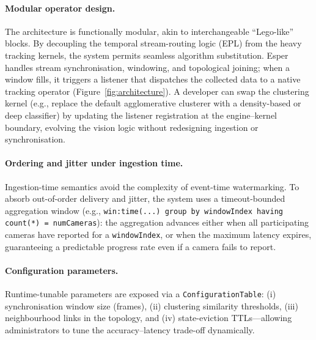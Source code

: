 \documentclass[review]{elsarticle}
\begin{document}
\paragraph{Modular operator design.}
The architecture is functionally modular, akin to interchangeable ``Lego-like'' blocks. By decoupling the temporal stream-routing logic (EPL) from the heavy tracking kernels, the system permits seamless algorithm substitution. Esper handles stream synchronisation, windowing, and topological joining; when a window fills, it triggers a listener that dispatches the collected data to a native tracking operator (Figure~\ref{fig:architecture}). A developer can swap the clustering kernel (e.g., replace the default agglomerative clusterer with a density-based or deep classifier) by updating the listener registration at the engine--kernel boundary, evolving the vision logic without redesigning ingestion or synchronisation.

\paragraph{Ordering and jitter under ingestion time.}
Ingestion-time semantics avoid the complexity of event-time watermarking. To absorb out-of-order delivery and jitter, the system uses a timeout-bounded aggregation window (e.g., \texttt{win:time(...) group by windowIndex having count(*) = numCameras}): the aggregation advances either when all participating cameras have reported for a \texttt{windowIndex}, or when the maximum latency expires, guaranteeing a predictable progress rate even if a camera fails to report.

\paragraph{Configuration parameters.}
Runtime-tunable parameters are exposed via a \texttt{ConfigurationTable}: (i) synchronisation window size (frames), (ii) clustering similarity thresholds, (iii) neighbourhood links in the topology, and (iv) state-eviction TTLs---allowing administrators to tune the accuracy--latency trade-off dynamically.

\end{document}
